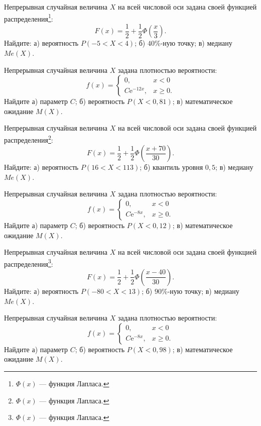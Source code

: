 \vfill

\newpage\setcounter{zad}{0}

\z Непрерывная случайная величина $X$ на всей числовой оси задана своей функцией распределения\footnote{$\Phi(x)$ --- функция Лапласа.}: $$ F(x) = \frac{1}{2} + \frac{1}{2}\Phi\left( \frac{x}{3} \right). $$ Найдите: а) вероятность $P(-5 < X < 4)$; б) $40\%$-ную точку; в) медиану $Me(X)$.


\vfill

\z Непрерывная случайная величина $X$ задана плотностью вероятности: $$ f(x) = \begin{cases}0, & x < 0 \\ C\mathrm{e}^{-12x}, & x \geqslant 0.\end{cases} $$ Найдите а) параметр $C$; б) вероятность $P(X < 0{,}81)$; в) математическое ожидание $M(X)$.
 

\vfill

\newpage\setcounter{zad}{0}

\z Непрерывная случайная величина $X$ на всей числовой оси задана своей функцией распределения\footnote{$\Phi(x)$ --- функция Лапласа.}: $$ F(x) = \frac{1}{2} + \frac{1}{2}\Phi\left( \frac{x + 70}{30} \right). $$ Найдите: а) вероятность $P(16 < X < 113)$; б) квантиль уровня $0{,}5$; в) медиану $Me(X)$.


\vfill

\z Непрерывная случайная величина $X$ задана плотностью вероятности: $$ f(x) = \begin{cases}0, & x < 0 \\ C\mathrm{e}^{-8x}, & x \geqslant 0.\end{cases} $$ Найдите а) параметр $C$; б) вероятность $P(X < 0{,}12)$; в) математическое ожидание $M(X)$.
 

\vfill

\newpage\setcounter{zad}{0}

\z Непрерывная случайная величина $X$ на всей числовой оси задана своей функцией распределения\footnote{$\Phi(x)$ --- функция Лапласа.}: $$ F(x) = \frac{1}{2} + \frac{1}{2}\Phi\left( \frac{x - 40}{30} \right). $$ Найдите: а) вероятность $P(-80 < X < 13)$; б) $90\%$-ную точку; в) медиану $Me(X)$.


\vfill

\z Непрерывная случайная величина $X$ задана плотностью вероятности: $$ f(x) = \begin{cases}0, & x < 0 \\ C\mathrm{e}^{-8x}, & x \geqslant 0.\end{cases} $$ Найдите а) параметр $C$; б) вероятность $P(X < 0{,}98)$; в) математическое ожидание $M(X)$.
 

